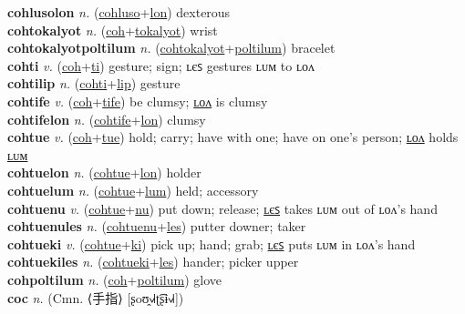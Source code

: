 \textbf{cohlusolon} \textit{n.} (\hyperref[cohluso]{cohluso}+\hyperref[lon]{lon})
dexterous \label{cohlusolon} \\
\textbf{cohtokalyot} \textit{n.} (\hyperref[coh]{coh}+\hyperref[tokalyot]{tokalyot})
wrist \label{cohtokalyot} \\
\textbf{cohtokalyotpoltilum} \textit{n.} (\hyperref[cohtokalyot]{cohtokalyot}+\hyperref[poltilum]{poltilum})
bracelet \label{cohtokalyotpoltilum} \\
\textbf{cohti} \textit{v.} (\hyperref[coh]{coh}+\hyperref[ti]{ti})
gesture; sign; ʟєꜱ gestures ʟᴜᴍ to ʟᴏᴧ \label{cohti} \\
\textbf{cohtilip} \textit{n.} (\hyperref[cohti]{cohti}+\hyperref[lip]{lip})
gesture \label{cohtilip} \\
\textbf{cohtife} \textit{v.} (\hyperref[coh]{coh}+\hyperref[tife]{tife})
be clumsy; \hyperref[cohtifelon]{ʟᴏᴧ} is clumsy \label{cohtife} \\
\textbf{cohtifelon} \textit{n.} (\hyperref[cohtife]{cohtife}+\hyperref[lon]{lon})
clumsy \label{cohtifelon} \\
\textbf{cohtue} \textit{v.} (\hyperref[coh]{coh}+\hyperref[tue]{tue})
hold; carry; have with one; have on one's person; \hyperref[cohtuelon]{ʟᴏᴧ} holds \hyperref[cohtuelum]{ʟᴜᴍ} \label{cohtue} \\
\textbf{cohtuelon} \textit{n.} (\hyperref[cohtue]{cohtue}+\hyperref[lon]{lon})
holder \label{cohtuelon} \\
\textbf{cohtuelum} \textit{n.} (\hyperref[cohtue]{cohtue}+\hyperref[lum]{lum})
held; accessory \label{cohtuelum} \\
\textbf{cohtuenu} \textit{v.} (\hyperref[cohtue]{cohtue}+\hyperref[nu]{nu})
put down; release; \hyperref[cohtuenules]{ʟєꜱ} takes ʟᴜᴍ out of ʟᴏᴧ's hand \label{cohtuenu} \\
\textbf{cohtuenules} \textit{n.} (\hyperref[cohtuenu]{cohtuenu}+\hyperref[les]{les})
putter downer; taker \label{cohtuenules} \\
\textbf{cohtueki} \textit{v.} (\hyperref[cohtue]{cohtue}+\hyperref[ki]{ki})
pick up; hand; grab; \hyperref[cohtuekiles]{ʟєꜱ} puts ʟᴜᴍ in ʟᴏᴧ's hand \label{cohtueki} \\
\textbf{cohtuekiles} \textit{n.} (\hyperref[cohtueki]{cohtueki}+\hyperref[les]{les})
hander; picker upper \label{cohtuekiles} \\
\textbf{cohpoltilum} \textit{n.} (\hyperref[coh]{coh}+\hyperref[poltilum]{poltilum})
glove \label{cohpoltilum} \\
\textbf{coc} \textit{n.} (Cmn. ⟨手指⟩ [ʂoʊ̯˧˩˧ʈ͡ʂɨ˧˩˧])
